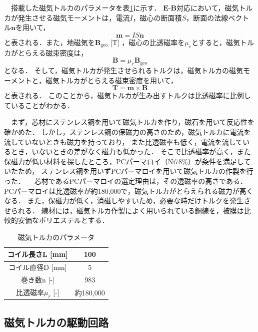 　搭載した磁気トルカのパラメータを表\ref{table:torquer}に示す．
$\boldsymbol{E\text{-}B}$対応において，磁気トルカが発生させる磁気モーメントは，電流$I$，磁心の断面積$S$，断面の法線ベクトル$\boldsymbol{n}$を用いて，
\begin{equation}
	\boldsymbol{m}=IS\boldsymbol{n}
\end{equation}
と表される．また，地磁気を$\boldsymbol{B}_\mathrm{geo}$ [T] ，磁心の比透磁率を$\mu_r$とすると，磁気トルカがとらえる磁束密度は，
\begin{equation}
	\boldsymbol{B} = \mu_r\boldsymbol{B}_\mathrm{geo}
\end{equation}
となる．
そして，磁気トルカが発生させられるトルクは，磁気トルカの磁気モーメントと，磁気トルカがとらえる磁束密度を用いて，
\begin{equation}
	\boldsymbol{T = m \times B}
\end{equation}
と表される．
このことから，磁気トルカが生み出すトルクは比透磁率に比例していることがわかる．

　まず，芯材にステンレス鋼を用いて磁気トルカを作り，磁石を用いて反応性を確かめた．
しかし，ステンレス鋼の保磁力の高さのため，磁気トルカに電流を流していないときも磁力を持っており，
また比透磁率も低く，電流を流しているとき，いないときの差がなく磁力も低かった．
そこで比透磁率が高く，また保磁力が低い材料を探したところ，PCパーマロイ（Ni78\%）が条件を満足していたため，
ステンレス鋼を用いずPCパーマロイを用いて磁気トルカの作製を行った．
　芯材であるPCパーマロイの選定理由は，その透磁率の高さである．PCパーマロイは比透磁率が約180,000で，磁気トルカがとらえられる磁力が高くなる．
また，保磁力が低く，消磁しやすいため，必要な時だけトルクを発生させられる．
線材には，磁気トルカ作製によく用いられている銅線を，被膜は比較的安価なポリエステルとする．

\begin{table}[H]
	\centering
	\caption{磁気トルカのパラメータ}
	\label{table:torquer}
	\begin{tabular}{|c||c|}
		\hline
		コイル長さL [mm] & 100\\ \hline
		コイル直径D [mm] & 5\\ \hline
		巻き数n [-] & 983 \\ \hline
		比透磁率$\mu_r$ [-] & 約180,000 \\ \hline  
	\end{tabular}
\end{table}


\subsection{磁気トルカの駆動回路}
